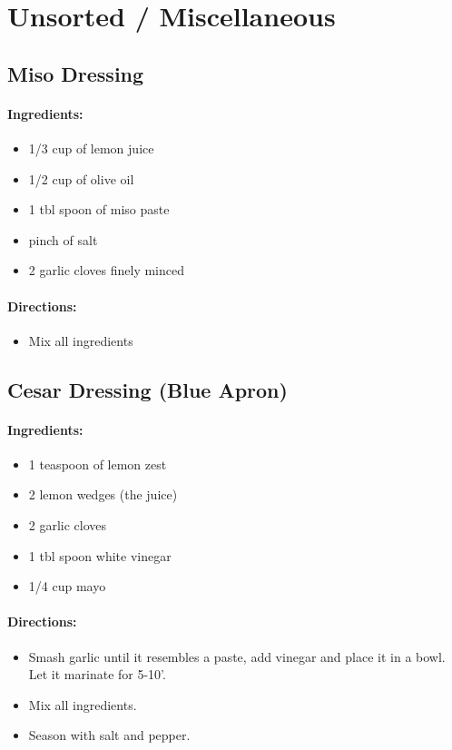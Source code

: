 \documentclass{article}
\begin{document}
\section{Unsorted / Miscellaneous}


\subsection{Miso Dressing}

\paragraph{Ingredients:}
\begin{itemize}
    \item 1/3 cup of lemon juice
    \item 1/2 cup of olive oil
    \item 1 tbl spoon of miso paste
    \item pinch of salt
    \item 2 garlic cloves finely minced
\end{itemize}

\paragraph{Directions:}
\begin{itemize}
    \item Mix all ingredients
\end{itemize}

\subsection{Cesar Dressing (Blue Apron)}

\paragraph{Ingredients:}
\begin{itemize}
    \item 1 teaspoon of lemon zest
    \item 2 lemon wedges (the juice)
    \item 2 garlic cloves
    \item 1 tbl spoon white vinegar
    \item 1/4 cup mayo
\end{itemize}

\paragraph{Directions:}
\begin{itemize}
    \item Smash garlic until it resembles a paste, add vinegar and place it in a bowl. Let it marinate for 5-10'.
    \item Mix all ingredients.
    \item Season with salt and pepper.
\end{itemize}
\end{document}

